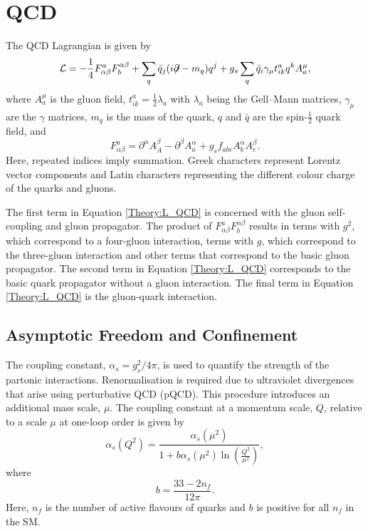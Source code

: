 \section{QCD}
\label{Theory:QCD}
The QCD Lagrangian is given by 
\begin{equation}
\mathcal{L} = - \frac{1}{4} F^{a}_{\alpha\beta} F_{b}^{\alpha\beta} + \sum_{q} \bar{q}_{j}( i{\not}\partial - m_{q})q^{j}  + g_s\sum_{q} \bar{q}_{i}\gamma_{\mu} t^{a}_{ik} q^{k} A^{\mu}_{a}, 
\label{Theory:L_QCD}
\end{equation}
where $A^{\mu}_{a}$ is the gluon field, $t^{a}_{ik}=\frac{1}{2}\lambda_{a}$ with $\lambda_{a}$ being the Gell--Mann matrices, $\gamma_{\mu}$ are the $\gamma$ matrices, $m_{q}$ is the mass of the quark, $q$ and $\bar{q}$ are the spin-$\frac{1}{2}$ quark field, and 
\begin{equation}
F^{a}_{\alpha\beta} = \partial^{\alpha}A_{A}^{\beta} - \partial^{\beta}A_{a}^{\alpha} + g_s f_{abc} A_{b}^{\alpha}A_{c}^{\beta}. 
\label{Theory:F_Tensor}
\end{equation}
Here, repeated indices imply summation. 
Greek characters represent Lorentz vector components and Latin characters representing the different colour charge of the quarks and gluons. 

The first term in Equation \ref{Theory:L_QCD} is concerned with the gluon self-coupling and gluon propagator. 
The product of $F^{a}_{\alpha\beta} F_{b}^{\alpha\beta}$ results in terms with $g^2$, which correspond to a four-gluon interaction, terms with $g$, which correspond to the three-gluon interaction and other terms that correspond to the basic gluon propagator.
The second term in Equation \ref{Theory:L_QCD} corresponds to the basic quark propagator without a gluon interaction.
The final term in Equation \ref{Theory:L_QCD} is the gluon-quark interaction.

\subsection{Asymptotic Freedom and Confinement}


The coupling constant, $\alpha_{s} = g_s^2/4\pi$, is used to quantify the strength of the partonic interactions.
Renormalisation is required due to ultraviolet divergences that arise using perturbative QCD (pQCD). 
This procedure introduces an additional mass scale, $\mu$.
The coupling constant at a momentum scale, $Q$, relative to a scale $\mu$ at one-loop order is given by
\begin{equation}
\alpha_{s}(Q^2) = \frac{\alpha_{s}(\mu^2)}{1+b\alpha_{s}(\mu^2)\ln(\frac{Q^2}{\mu^2})},
\label{Theory:Coupling}
\end{equation}
where 
\begin{equation}
b = \frac{33-2n_f}{12\pi}.
\label{Theory:b_Coupling}
\end{equation}
Here, $n_f$ is the number of active flavours of quarks and $b$ is positive for all $n_f$ in the SM.


